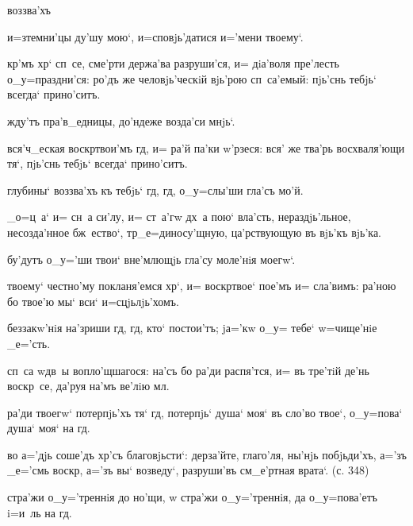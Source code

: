 
  воззва'хъ 

  и=з\ъ темни'цы ду'шу мою`, 
и=сповjь'датися и='мени твоему`.

 кр'мъ хр` сп~се, сме'рти держа'ва 
разруши'ся, и= дiа'воля пре'лесть о_у=праздни'ся: ро'дъ 
же человjь'ческiй вjь'рою сп~са'емый: пjь'снь тебjь` 
всегда` прино'ситъ.

  жду'тъ пра'в_едницы, до'ндеже 
возда'си мнjь`.

 вся'ч_еская воскр твои'мъ 
гд, и= ра'й па'ки w'рзеся: вся' же тва'рь 
восхваля'ющи тя`, пjь'снь тебjь` всегда` прино'ситъ.

  глубины` воззва'хъ къ тебjь` гд, 
гд, о_у=слы'ши гла'съ мо'й.

 _о=ц~а` и= сн~а си'лу, и= ст~а'гw дх~а 
пою` вла'сть, нераздjь'льное, несозда'нное бж~ество`, 
тр _е=диносу'щную, ца'рствующую въ вjь'къ вjь'ка.


  бу'дутъ о_у='ши твои` вне'млющjь гла'су 
моле'нiя моегw`.

 твоему` честно'му покланя'емся хр`, и= 
воскр твое` пое'мъ и= сла'вимъ: ра'ною бо твое'ю мы` 
вси` и=сцjьлjь'хомъ.

  беззакw'нiя на'зриши гд, гд, 
кто` постои'тъ; jа='кw о_у= тебе` w=чище'нiе _е='сть.

 сп~са w\т дв~ы вопло'щшагося: на'съ бо 
ра'ди распя'тся, и= въ тре'тiй де'нь воскр~се, да'руя 
на'мъ ве'лiю мл.

  ра'ди твоегw` потерпjь'хъ тя` 
гд, потерпjь` душа` моя` въ сло'во твое`, о_у=пова` 
душа` моя` на гд.

 во а='дjь соше'дъ хр'съ благовjьсти`: 
дерза'йте, глаго'ля, ны'нjь побjьди'хъ, а='зъ _е='смь 
воскр, а='зъ вы` возведу`, разруши'въ см_е'ртная 
врата`. (с. 348) 

 стра'жи о_у='треннiя до но'щи, w\т 
стра'жи о_у='треннiя, да о_у=пова'етъ i=и~ль на гд.


